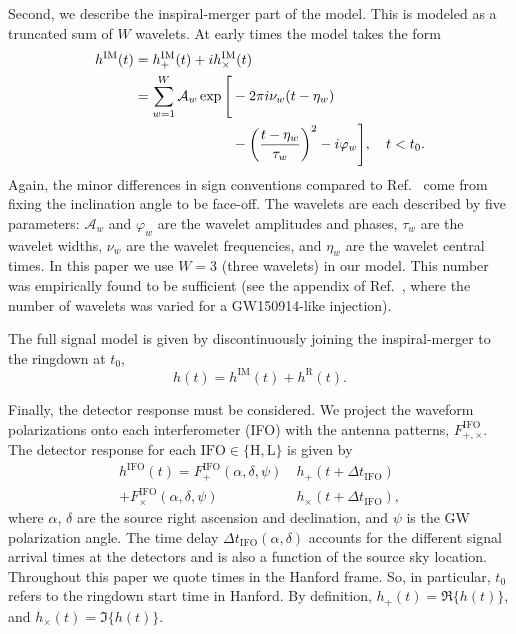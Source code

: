 Second, we describe the inspiral-merger part of the model.
This is modeled as a truncated sum of $W$ wavelets.
At early times the model takes the form
\begin{align} 
	h^\mathrm{IM}(t) &=  h_+^\mathrm{IM}(t) + ih_\times^\mathrm{IM}(t) \nonumber \\
	&= \sum_{w=1}^{W} \mathcal{A}_w \exp \Bigg[-2\pi i \nu_w(t-\eta_w) \label{eq:wavelets} \\
	&\hspace{2.46cm} - \qty(\frac{t-\eta_w}{\tau_w})^2 - i\varphi_w \Bigg], \quad t < t_0. \nonumber
\end{align}
Again, the minor differences in sign conventions compared to Ref.~\cite{Finch:2021qph} come from fixing the inclination angle to be face-off. 
The wavelets are each described by five parameters: $\mathcal{A}_w$ and $\varphi_w$ are the wavelet amplitudes and phases, $\tau_w$ are the wavelet widths, $\nu_w$ are the wavelet frequencies, and $\eta_w$ are the wavelet central times. 
In this paper we use $W=3$ (three wavelets) in our model.
This number was empirically found to be sufficient (see the appendix of Ref.~\cite{Finch:2021qph}, where the number of wavelets was varied for a GW150914-like injection).

The full signal model is given by discontinuously joining the inspiral-merger to the ringdown at $t_0$,
\begin{equation}
	h(t) = h^\mathrm{IM}(t) + h^\mathrm{R}(t).
\end{equation}

Finally, the detector response must be considered.
We project the waveform polarizations onto each interferometer (IFO) with the antenna patterns, $F^\mathrm{IFO}_{+,\times}$.
The detector response for each ${\mathrm{IFO}\in \{\mathrm{H}, \mathrm{L}\}}$ is given by
\begin{align} \label{eq:projection_antenna}
	h^\mathrm{IFO}(t) = F^\mathrm{IFO}_+(\alpha, \delta, \psi) ~ &h_+(t + \Delta t_\mathrm{IFO}) \nonumber \\
	+ F^\mathrm{IFO}_\times(\alpha, \delta, \psi) ~ &h_\times(t + \Delta t_\mathrm{IFO}),
\end{align}
where $\alpha$, $\delta$ are the source right ascension and declination, and $\psi$ is the GW polarization angle.
The time delay $\Delta t_\mathrm{IFO}(\alpha, \delta)$ accounts for the different signal arrival times at the detectors and is also a function of the source sky location.
Throughout this paper we quote times in the Hanford frame.
So, in particular, $t_0$ refers to the ringdown start time in Hanford.
By definition, $h_+(t) = \Re\{ h(t) \}$, and $h_\times(t) = \Im \{ h(t) \}$.


